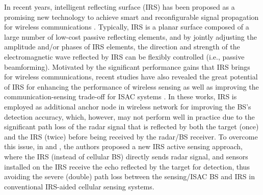 \documentclass[10pt,final,doublecolumn]{IEEEtran}
\begin{document}
In recent years, intelligent reflecting surface (IRS) has been proposed as a promising new technology to achieve smart and reconfigurable signal propagation for wireless communications \cite{qing,wei}. Typically, IRS is a planar surface composed of a large number of low-cost passive reflecting elements, and by jointly adjusting the amplitude and/or phases of IRS elements, the direction and strength of the electromagnetic wave reflected by IRS can be flexibly  controlled (i.e., passive beamforming). Motivated by the significant performance gains that IRS brings for wireless communications, recent studies have also revealed the great potential of IRS for enhancing the performance of wireless sensing \cite{xujie,s2,s3,fangjun} as well as improving the communication-sensing trade-off for ISAC systems \cite{isac0, isac-2,isac-3}. In these works, IRS is employed as additional anchor node in wireless network for improving the BS's detection accuracy, which, however, may not perform well in practice due to the significant path loss of the radar signal that is reflected by both the target (once) and the IRS (twice) before being received by the radar/BS receiver. To overcome this issue, in \cite{shaos} and \cite{shaos1}, the authors proposed a new IRS active sensing approach, where the
IRS (instead of cellular BS) directly sends radar signal, and sensors
installed on the IRS receive the echo reflected by the target
for detection, thus avoiding the severe (double)
path loss between the sensing/ISAC BS
and IRS in conventional IRS-aided cellular sensing systems.
\end{document}
